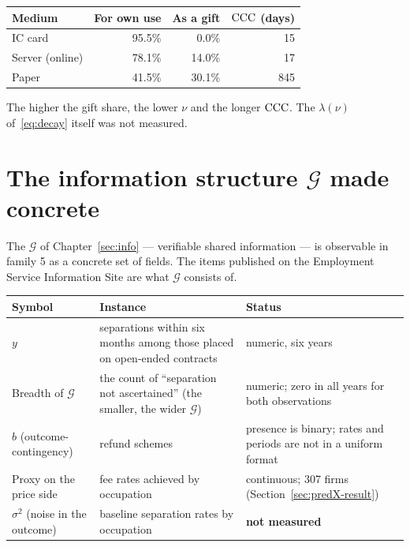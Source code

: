\begin{center}
\begin{tabular}{@{}lrrr@{}}
\toprule
Medium & For own use & As a gift & $\mathrm{CCC}$ (days) \\
\midrule
IC card & 95.5\% & 0.0\% & 15 \\
Server (online) & 78.1\% & 14.0\% & 17 \\
Paper & 41.5\% & 30.1\% & 845 \\
\bottomrule
\end{tabular}
\label{tab:media-purchase-reason}
\end{center}

The higher the gift share, the lower $\nu$ and the longer $\mathrm{CCC}$. The $\lambda(\nu)$
of~\eqref{eq:decay} itself was not measured.

\section{The information structure \texorpdfstring{$\mathcal{G}$}{G} made concrete}

The $\mathcal{G}$ of Chapter~\ref{sec:info} --- verifiable shared information --- is
observable in family 5 as a concrete set of fields. The items published on the Employment
Service Information Site are what $\mathcal{G}$ consists of.

\begin{center}
\begin{tabularx}{\textwidth}{@{}P{0.22\textwidth}XP{0.26\textwidth}@{}}
\toprule
Symbol & Instance & Status \\
\midrule
$y$ & separations within six months among those placed on open-ended contracts & numeric, six years \\
Breadth of $\mathcal{G}$ & the count of ``separation not ascertained'' (the smaller, the wider $\mathcal{G}$) & numeric; zero in all years for both observations \\
$b$ (outcome-contingency) & refund schemes & presence is binary; rates and periods are not in a uniform format \\
Proxy on the price side & fee rates achieved by occupation & continuous; 307 firms (Section~\ref{sec:predX-result}) \\
$\sigma^2$ (noise in the outcome) & baseline separation rates by occupation & \textbf{not measured} \\
\bottomrule
\end{tabularx}
\label{tab:info-structure-observed}
\end{center}


